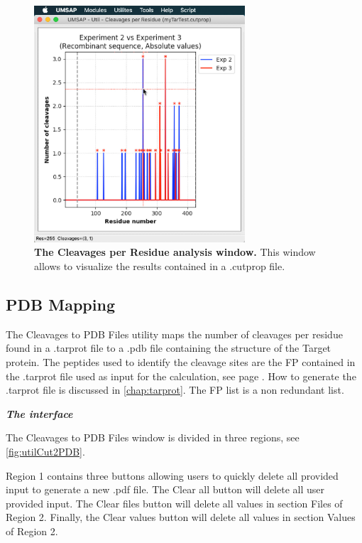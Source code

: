 \begin{figure}[h]
	\centering
	\includegraphics[width=0.7\textwidth]{./IMAGES/UTIL-CUTPROP-WINDOW/util-cutprop-res.jpg}	    
	\caption[The Cleavages per Residue analysis window]{\textbf{The Cleavages per Residue analysis window.} This window allows to visualize the results contained in a .cutprop file.} 
	\label{fig:utilCutsPerRes}
	\vspace{-5pt} 	
\end{figure}

\subsection{PDB Mapping}

\label{subsec:utilCut2Pdb}

The Cleavages to PDB Files utility maps the number of cleavages per residue found in a .tarprot file to a .pdb file containing the structure of the Target protein. The peptides used to identify the cleavage sites are the FP contained in the .tarprot file used as input for the calculation, see page \pageref{par:tarprotPIP}. How to generate the .tarprot file is discussed in \autoref{chap:tarprot}. The FP list is a non redundant list.

\textit{\textbf{The interface}}

The Cleavages to PDB Files window is divided in three regions, see \autoref{fig:utilCut2PDB}.

Region \num{1} contains three buttons allowing users to quickly delete all provided input to generate a new .pdf file. The Clear all button will delete all user provided input. The Clear files button will delete all values in section Files of Region \num{2}. Finally, the Clear values button will delete all values in section Values of Region \num{2}.


